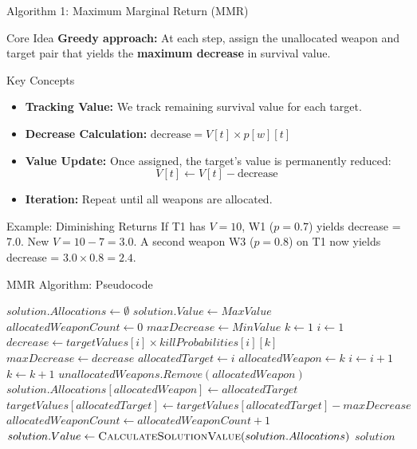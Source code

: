 \documentclass[aspectratio=43,8pt]{beamer}
\begin{document}
\begin{frame}{Algorithm 1: Maximum Marginal Return (MMR)}
\begin{block}{Core Idea}
\textbf{Greedy approach:} At each step, assign the unallocated weapon and target pair that yields the \textbf{maximum decrease} in survival value.
\end{block}

\vspace{0.2cm}
\begin{exampleblock}{Key Concepts}
\begin{itemize}
    \item \textbf{Tracking Value:} We track remaining survival value for each target.
    \item \textbf{Decrease Calculation:} $\text{decrease} = V[t] \times p[w][t]$
    \item \textbf{Value Update:} Once assigned, the target's value is permanently reduced:
    $$V[t] \gets V[t] - \text{decrease}$$
    \item \textbf{Iteration:} Repeat until all weapons are allocated.
\end{itemize}
\end{exampleblock}

\begin{alertblock}{Example: Diminishing Returns}
If T1 has $V=10$, W1 ($p=0.7$) yields decrease = 7.0.
New $V = 10 - 7 = 3.0$.
A second weapon W3 ($p=0.8$) on T1 now yields decrease = $3.0 \times 0.8 = 2.4$.
\end{alertblock}
\end{frame}

\begin{frame}[fragile]{MMR Algorithm: Pseudocode}
\begin{algorithm}[H]
\caption{Maximum Marginal Return (MMR) Algorithm}
\begin{algorithmic}[1]
\State $solution.Allocations \gets \emptyset$
\State $solution.Value \gets MaxValue$
\State $allocatedWeaponCount \gets 0$
    \State $maxDecrease \gets MinValue$
    \State $k \gets 1$
        \State $i \gets 1$
            \State $decrease \gets targetValues[i] \times killProbabilities[i][k]$
                \State $maxDecrease \gets decrease$
                \State $allocatedTarget \gets i$
                \State $allocatedWeapon \gets k$
            \EndIf
            \State $i \gets i + 1$
        \EndWhile
        \State $k \gets k + 1$
    \EndWhile
    \State $unallocatedWeapons.Remove(allocatedWeapon)$
    \State $solution.Allocations[allocatedWeapon] \gets allocatedTarget$
    \State $targetValues[allocatedTarget] \gets targetValues[allocatedTarget] - maxDecrease$
    \State $allocatedWeaponCount \gets allocatedWeaponCount + 1$
\EndWhile
\State $solution.Value \gets \Call{CalculateSolutionValue}{solution.Allocations}$
\State \Return $solution$
\end{algorithmic}
\end{algorithm}
\end{frame}
\end{document}
